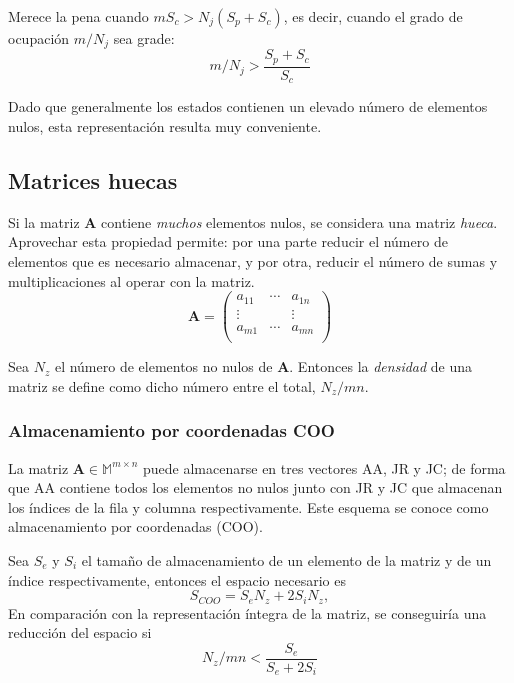 \documentclass{article}
\newcommand*\mat[1]{ \begin{pmatrix} #1 \end{pmatrix}}
\theoremstyle{definition}
\begin{document}
Merece la pena cuando $mS_c > N_j(S_p + S_c)$, es decir, cuando el grado de 
ocupación $m/N_j$ sea grade:
$$m/N_j > \frac{S_p + S_c}{S_c}$$

Dado que generalmente los estados contienen un elevado número de elementos 
nulos, esta representación resulta muy conveniente.


\subsection{Matrices huecas}

Si la matriz \textbf{A} contiene \textit{muchos} elementos nulos, se considera 
una matriz \textit{hueca}. Aprovechar esta propiedad permite: por una parte 
reducir el número de elementos que es necesario almacenar, y por otra, reducir 
el número de sumas y multiplicaciones al operar con la matriz.
$$ \textbf{A} = \mat{ a_{11} & \cdots & a_{1n} \\
		\vdots &   & \vdots \\
		a_{m1} & \cdots & a_{mn}\\
	}
$$

Sea $N_z$ el número de elementos no nulos de \textbf{A}. Entonces la 
\textit{densidad} de una matriz se define como dicho número entre el total, 
$N_z/mn$.

\subsubsection{Almacenamiento por coordenadas COO}

La matriz $\textbf{A} \in \mathbb{M}^{m\times n}$ puede almacenarse en tres 
vectores AA, JR y JC; de forma que AA contiene todos los elementos no nulos 
junto con JR y JC que almacenan los índices de la fila y columna 
respectivamente. Este esquema se conoce como almacenamiento por coordenadas 
(COO).

Sea $S_e$ y $S_i$ el tamaño de almacenamiento de un elemento de la matriz y de 
un índice respectivamente, entonces el espacio necesario es
$$ S_{COO} = S_eN_z + 2S_iN_z, $$
En comparación con la representación íntegra de la matriz, se conseguiría una 
reducción del espacio si
$$ N_z/mn < \frac{S_e}{S_e + 2S_i} $$
\end{document}
